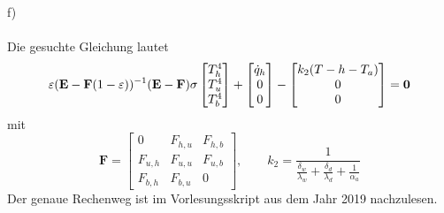 f)\\ \\
Die gesuchte Gleichung lautet 
\[
	\varepsilon(\textbf{E} - \textbf{F}(1 - \varepsilon))^{-1}(\textbf{E} - \textbf{F})\sigma\begin{bmatrix}
	T_h^4\\ T_u^4 \\ T_b^4
	\end{bmatrix}
	+
	\begin{bmatrix}
		\dot{q}_h \\ 0 \\ 0
	\end{bmatrix}
	-
	\begin{bmatrix}
		k_2(T-h - T_a) \\ 0 \\ 0
	\end{bmatrix}
	= \textbf{\text{0}}
\]
mit
\[
	\textbf{F} = \begin{bmatrix}
		0 & F_{h,u} & F_{h,b} \\
		F_{u,h} & F_{u,u} & F_{u,b} \\
		F_{b,h} & F_{b,u} & 0  
	\end{bmatrix}
	,
	\qquad
	k_2 = \frac{1}{\frac{\delta_w}{\lambda_w} + \frac{\delta_d}{\lambda_d} + \frac{1}{\alpha_a}}
\]
Der genaue Rechenweg ist im Vorlesungsskript aus dem Jahr 2019 nachzulesen.